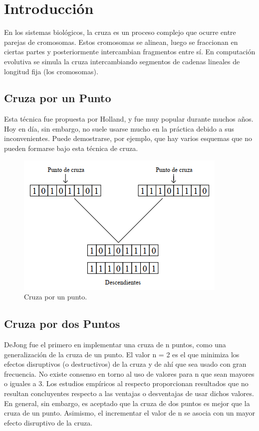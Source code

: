 \documentclass[11pt,letterpaper]{article}
\begin{document}


\section*{Introducción}

En los sistemas biológicos, la cruza es un proceso complejo que ocurre entre parejas de cromosomas. Estos cromosomas se alinean, luego se fraccionan en ciertas
partes y posteriormente intercambian fragmentos entre sí.
En computación evolutiva se simula la cruza intercambiando segmentos de
cadenas lineales de longitud fija (los cromosomas).

\subsection*{Cruza por un Punto}
Esta técnica fue propuesta por Holland, y fue muy popular durante muchos
años. Hoy en día, sin embargo, no suele usarse mucho en la práctica debido a sus
inconvenientes. Puede demostrarse, por ejemplo, que hay varios esquemas que no
pueden formarse bajo esta técnica de cruza.

\begin{figure}[H]
	\centering
	\includegraphics[scale = 0.7]{images/cup}
	\caption{Cruza por un punto.}
\end{figure}

\subsection*{Cruza por dos Puntos}
DeJong fue el primero en implementar una cruza de n puntos, como una
generalización de la cruza de un punto.
El valor n = 2 es el que minimiza los efectos disruptivos (o destructivos) de
la cruza y de ahí que sea usado con gran frecuencia.
No existe consenso en torno al uso de valores para n que sean mayores o
iguales a 3.
Los estudios empíricos al respecto proporcionan resultados que no
resultan concluyentes respecto a las ventajas o desventajas de usar dichos valores.
En general, sin embargo, es aceptado que la cruza de dos puntos es mejor que
la cruza de un punto.
Asimismo, el incrementar el valor de n se asocia con un mayor efecto disruptivo de la cruza.
\end{document}
